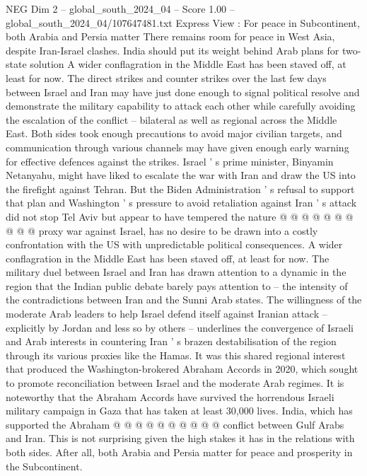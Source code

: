 \begin{textsample}{NEG Dim 2 – global\_south\_2024\_04 – Score 1.00 – global\_south\_2024\_04/107647481.txt}  \label{ex:f2_neg_295}
Express View : For peace in Subcontinent, both Arabia and Persia matter There remains room for peace in West Asia, despite Iran-Israel clashes.
India should put its weight behind Arab plans for two-state solution A wider conflagration in the Middle East has been staved off, at least for now.
The direct strikes and counter strikes over the last few days between Israel and Iran may have just done enough to signal political resolve and demonstrate the military capability to attack each other while carefully avoiding the escalation of the conflict -- bilateral as well as regional across the Middle East.
Both sides took enough precautions to avoid major civilian targets, and communication through various channels may have given enough early warning for effective defences against the strikes.
Israel ' s prime minister, Binyamin Netanyahu, might have liked to escalate the war with Iran and draw the US into the firefight against Tehran.
But the Biden Administration ' s refusal to support that plan and Washington ' s pressure to avoid retaliation against Iran ' s attack did not stop Tel Aviv but appear to have tempered the nature @ @ @ @ @ @ @ @ @ @ proxy war against Israel, has no desire to be drawn into a costly confrontation with the US with unpredictable political consequences.
A wider conflagration in the Middle East has been staved off, at least for now.
The military duel between Israel and Iran has drawn attention to a dynamic in the region that the Indian public debate barely pays attention to -- the intensity of the contradictions between Iran and the Sunni Arab states.
The willingness of the moderate Arab leaders to help Israel defend itself against Iranian attack -- explicitly by Jordan and less so by others -- underlines the convergence of Israeli and Arab interests in countering Iran ' s brazen destabilisation of the region through its various proxies like the Hamas.
It was this shared regional interest that produced the Washington-brokered Abraham Accords in 2020, which sought to promote reconciliation between Israel and the moderate Arab regimes.
It is noteworthy that the Abraham Accords have survived the horrendous Israeli military campaign in Gaza that has taken at least 30,000 lives.
India, which has supported the Abraham @ @ @ @ @ @ @ @ @ @ conflict between Gulf Arabs and Iran.
This is not surprising given the high stakes it has in the relations with both sides.
After all, both Arabia and Persia matter for peace and prosperity in the Subcontinent.

\end{textsample}

